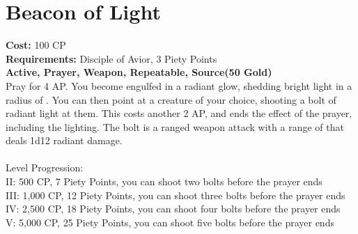 \section{Beacon of Light}\label{prayer:beaconOfLight}
\textbf{Cost:} 100 CP\\
\textbf{Requirements:} Disciple of Avior, 3 Piety Points \\
\textbf{Active, Prayer, Weapon, Repeatable, Source(50 Gold)}\\
Pray for 4 AP. You become engulfed in a radiant glow, shedding bright light in a radius of .
You can then point at a creature of your choice, shooting a bolt of radiant light at them.
This costs another 2 AP, and ends the effect of the prayer, including the lighting.
The bolt is a ranged weapon attack with a range of  that deals 1d12 radiant damage.\\
\\
Level Progression:\\
II: 500 CP, 7 Piety Points, you can shoot two bolts before the prayer ends\\
III: 1,000 CP, 12 Piety Points, you can shoot three bolts before the prayer ends\\
IV: 2,500 CP, 18 Piety Points, you can shoot four bolts before the prayer ends\\
V: 5,000 CP, 25 Piety Points, you can shoot five bolts before the prayer ends\\